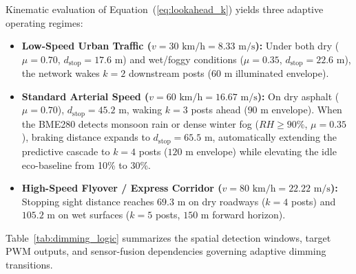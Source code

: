 \documentclass[11pt,a4paper]{article}
\begin{document}
Kinematic evaluation of Equation~(\ref{eq:lookahead_k}) yields three adaptive operating regimes:
\begin{itemize}
    \item \textbf{Low-Speed Urban Traffic (\(v = 30\text{ km/h} = 8.33\text{ m/s}\)):} Under both dry (\(\mu = 0.70\), \(d_{\text{stop}} = 17.6\text{ m}\)) and wet/foggy conditions (\(\mu = 0.35\), \(d_{\text{stop}} = 22.6\text{ m}\)), the network wakes \(k = 2\) downstream posts (\(60\text{ m}\) illuminated envelope).
    \item \textbf{Standard Arterial Speed (\(v = 60\text{ km/h} = 16.67\text{ m/s}\)):} On dry asphalt (\(\mu = 0.70\)), \(d_{\text{stop}} = 45.2\text{ m}\), waking \(k = 3\) posts ahead (\(90\text{ m}\) envelope). When the BME280 detects monsoon rain or dense winter fog (\(RH \ge 90\%\), \(\mu = 0.35\)), braking distance expands to \(d_{\text{stop}} = 65.5\text{ m}\), automatically extending the predictive cascade to \(k = 4\) posts (\(120\text{ m}\) envelope) while elevating the idle eco-baseline from 10\% to 30\%.
    \item \textbf{High-Speed Flyover / Express Corridor (\(v = 80\text{ km/h} = 22.22\text{ m/s}\)):} Stopping sight distance reaches \(69.3\text{ m}\) on dry roadways (\(k = 4\) posts) and \(105.2\text{ m}\) on wet surfaces (\(k = 5\) posts, \(150\text{ m}\) forward horizon).
\end{itemize}

Table~\ref{tab:dimming_logic} summarizes the spatial detection windows, target PWM outputs, and sensor-fusion dependencies governing adaptive dimming transitions.
\end{document}

